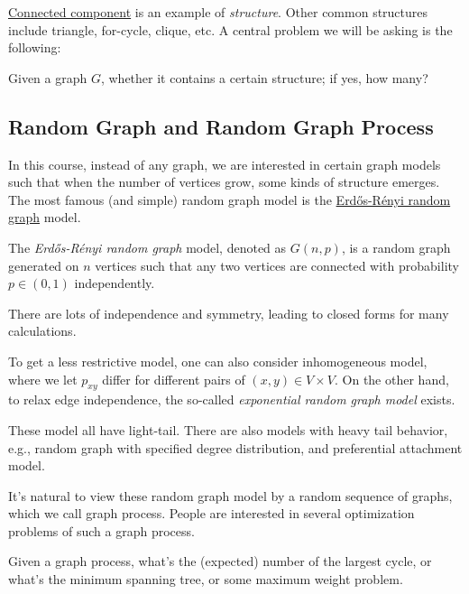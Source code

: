 \hyperref[def:connected-component]{Connected component} is an example of \emph{structure}. Other common structures include triangle, for-cycle, clique, etc. A central problem we will be asking is the following:

\begin{problem*}[Property]
	Given a graph \(G\), whether it contains a certain structure; if yes, how many?
\end{problem*}

\subsection{Random Graph and Random Graph Process}
In this course, instead of any graph, we are interested in certain graph models such that when the number of vertices grow, some kinds of structure emerges. The most famous (and simple) random graph model is the \hyperref[def:Erdős-Rényi-random-graph]{Erdős-Rényi random graph} model.

\begin{definition}\label{def:Erdős-Rényi-random-graph}
	The \emph{Erdős-Rényi random graph} model, denoted as \(G(n, p)\), is a random graph generated on \(n\) vertices such that any two vertices are connected with probability \(p \in (0, 1)\) independently.
\end{definition}

\begin{note}
	There are lots of independence and symmetry, leading to closed forms for many calculations.
\end{note}

To get a less restrictive model, one can also consider inhomogeneous model, where we let \(p_{xy}\) differ for different pairs of \((x , y) \in V \times V\). On the other hand,  to relax edge independence, the so-called \emph{exponential random graph model} exists.

\begin{remark}
	These model all have light-tail. There are also models with heavy tail behavior, e.g., random graph with specified degree distribution, and preferential attachment model.
\end{remark}

It's natural to view these random graph model by a random sequence of graphs, which we call graph process. People are interested in several optimization problems of such a graph process.

\begin{eg}
	Given a graph process, what's the (expected) number of the largest cycle, or what's the minimum spanning tree, or some maximum weight problem.
\end{eg}

